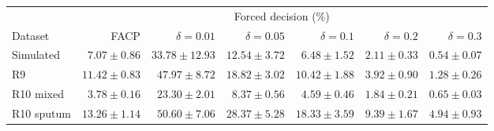 \begingroup\setlength{\tabcolsep}{4pt}
\begin{tabular}{@{}lrrrrrr@{}}
\toprule
 & \multicolumn{6}{c}{Forced decision (\%)}\\
\cmidrule(lr){2-7}
Dataset & FACP & $\delta=0.01$ & $\delta=0.05$ & $\delta=0.1$ & $\delta=0.2$ & $\delta=0.3$\\\midrule
Simulated & $7.07 \pm 0.86$ & $33.78 \pm 12.93$ & $12.54 \pm 3.72$ & $6.48 \pm 1.52$ & $2.11 \pm 0.33$ & $0.54 \pm 0.07$\\
R9 & $11.42 \pm 0.83$ & $47.97 \pm 8.72$ & $18.82 \pm 3.02$ & $10.42 \pm 1.88$ & $3.92 \pm 0.90$ & $1.28 \pm 0.26$\\
R10 mixed & $3.78 \pm 0.16$ & $23.30 \pm 2.01$ & $8.37 \pm 0.56$ & $4.59 \pm 0.46$ & $1.84 \pm 0.21$ & $0.65 \pm 0.03$\\
R10 sputum & $13.26 \pm 1.14$ & $50.60 \pm 7.06$ & $28.37 \pm 5.28$ & $18.33 \pm 3.59$ & $9.39 \pm 1.67$ & $4.94 \pm 0.93$\\
\bottomrule
\end{tabular}
\endgroup
